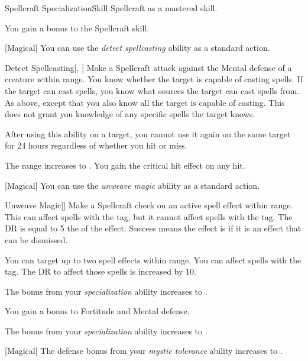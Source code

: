     \begin{feat}{Spellcraft Specialization}{Skill}
        \featpre Spellcraft as a mastered skill.

         You gain a  bonus to the Spellcraft skill.

        [Magical] You can use the \textit{detect spellcasting} ability as a standard action.
        \begin{freeability}{Detect Spellcasting}[, ]
            Make a Spellcraft attack against the Mental defense of a creature within \rngmed range.
            \hit You know whether the target is capable of casting spells.
            If the target can cast spells, you know what sources the target can cast spells from.
            \crit As above, except that you also know all  the target is capable of casting.
            This does not grant you knowledge of any specific spells the target knows.

            After using this ability on a target, you cannot use it again on the same target for 24 hours regardless of whether you hit or miss.

            \rankline
             The range increases to \rnglong.
             You gain the critical hit effect on any hit.
        \end{freeability}

        [Magical] You can use the \textit{unweave magic} ability as a standard action.
        \begin{freeability}{Unweave Magic}[]
            Make a Spellcraft check on an active spell effect within \rngmed range.
            This can affect spells with the  tag, but it cannot affect spells with the  tag.
            The DR is equal to 5 \add the  of the effect.
            Success means the effect is  if it is an effect that can be dismissed.

            \rankline
             You can target up to two spell effects within range.
             You can affect spells with the  tag.
            The DR to affect those spells is increased by 10.
        \end{freeability}

         The bonus from your \textit{specialization} ability increases to .

         You gain a  bonus to Fortitude and Mental defense.

         The bonus from your \textit{specialization} ability increases to .

        [Magical] The defense bonus from your \textit{mystic tolerance} ability increases to .
    \end{feat}

